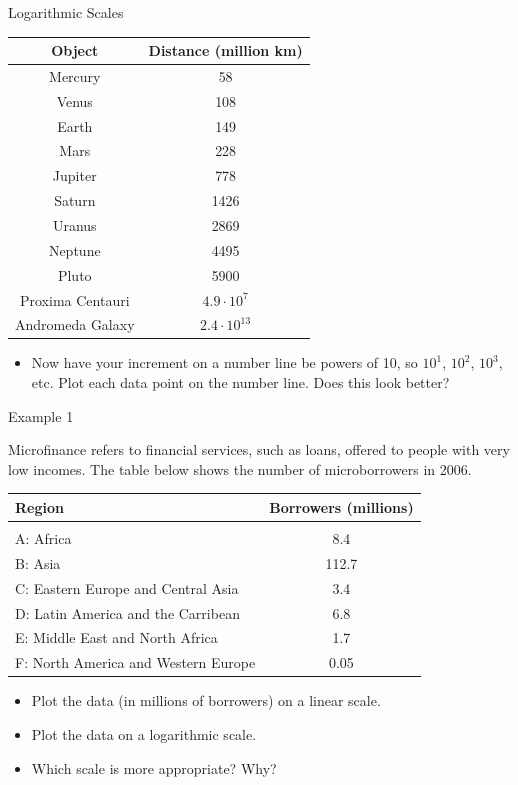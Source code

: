 \documentclass[ignorenonframetext,]{beamer}
\providecommand{\tightlist}{%
  \setlength{\itemsep}{0pt}\setlength{\parskip}{0pt}}
\begin{document}
\begin{frame}{Logarithmic Scales}

\begin{tabular}{c|c}
Object & Distance (million km) \\ \hline
Mercury & 58 \\
Venus & 108 \\
Earth & 149 \\
Mars & 228 \\
Jupiter & 778 \\
Saturn & 1426 \\
Uranus & 2869 \\
Neptune & 4495 \\
Pluto & 5900 \\
Proxima Centauri & $4.9 \cdot 10^7$ \\
Andromeda Galaxy & $2.4 \cdot 10^13$ \\
\end{tabular}

\begin{itemize}
\tightlist
\item
  Now have your increment on a number line be powers of 10, so \(10^1\),
  \(10^2\), \(10^3\), etc. Plot each data point on the number line. Does
  this look better?
\end{itemize}

\end{frame}

\begin{frame}{Example 1}

Microfinance refers to financial services, such as loans, offered to
people with very low incomes. The table below shows the number of
microborrowers in 2006.

\begin{tabular}{l|c}
Region & Borrowers (millions) \\ \hline \\
A: Africa & 8.4 \\
B: Asia & 112.7 \\
C: Eastern Europe and Central Asia & 3.4 \\
D: Latin America and the Carribean & 6.8 \\
E: Middle East and North Africa & 1.7 \\
F: North America and Western Europe & 0.05
\end{tabular}
\begin{itemize}
\item Plot the data (in millions of borrowers) on a linear scale.
\item Plot the data on a logarithmic scale.
\item Which scale is more appropriate? Why?
\end{itemize}
\end{frame}
\end{document}
